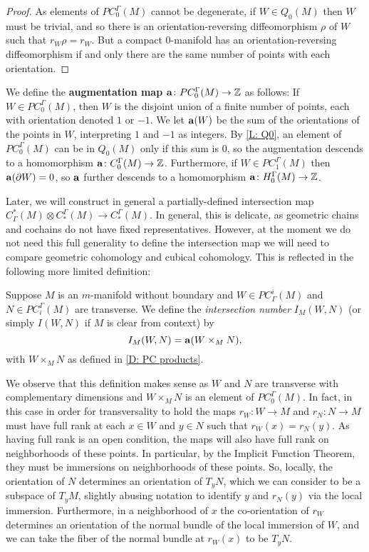 \begin{proof}
	As elements of $PC_0^\Gamma(M)$ cannot be degenerate, if $W \in Q_0(M)$ then $W$ must be trivial, and so there is an orientation-reversing diffeomorphism $\rho$ of $W$ such that $r_W\rho = r_W$.
	But a compact $0$-manifold has an orientation-reversing diffeomorphism if and only there are the same number of points with each orientation.
\end{proof}

\begin{definition}\label{D: aug}
	We define the \textbf{augmentation map} $\mathbf{a} \colon PC^\Gamma_0(M) \to \mathbb{Z}$ as follows: If $W \in PC^\Gamma_0(M)$, then $W$ is the disjoint union of a finite number of points, each with orientation denoted $1$ or $-1$.
	We let $\mathbf{a}(W)$ be the sum of the orientations of the points in $W$, interpreting $1$ and $-1$ as integers.
	By \cref{L: Q0}, an element of $PC^\Gamma_0(M)$ can be in $Q_0(M)$ only if this sum is $0$, so the augmentation descends to a homomorphism $\mathbf{a} \colon C^\Gamma_0(M) \to \mathbb{Z}$.
	Furthermore, if $W \in PC_1^\Gamma(M)$ then $\mathbf{a}(\partial W) = 0$, so $\mathbf{a}$ further descends to a homomorphism $\mathbf{a} \colon H_0^\Gamma(M) \to \mathbb{Z}$.
\end{definition}

Later, we will construct in general a partially-defined intersection map $C^*_\Gamma(M) \otimes C_*^\Gamma(M) \to C_*^\Gamma(M)$.
In general, this is delicate, as geometric chains and cochains do not have fixed representatives.
However, at the moment we do not need this full generality to define the intersection map we will need to compare geometric cohomology and cubical cohomology.
This is reflected in the following more limited definition:

\begin{definition}\label{D: intersection number}
	Suppose $M$ is an $m$-manifold without boundary and $W \in PC_\Gamma^i(M)$ and $N \in PC_{i}^\Gamma(M)$ are transverse.
	We define the \textit{intersection number} $I_M(W,N)$ (or simply $I(W,N)$ if $M$ is clear from context) by $$I_M(W,N) = \mathbf{a}(W \times_M N),$$ with $W \times_M N$ as defined in \cref{D: PC products}.
\end{definition}

We observe that this definition makes sense as $W$ and $N$ are transverse with complementary dimensions and $W \times_M N$ is an element of $PC_0^\Gamma(M)$.
In fact, in this case in order for transversality to hold the maps $r_W \colon W \to M$ and $r_N \colon N \to M$ must have full rank at each $x \in W$ and $y \in N$ such that $r_W(x) = r_N(y)$.
As having full rank is an open condition, the maps will also have full rank on neighborhoods of these points.
In particular, by the Implicit Function Theorem, they must be immersions on neighborhoods of these points.
So, locally, the orientation of $N$ determines an orientation of $T_yN$, which we can consider to be a subspace of $T_{y}M$, slightly abusing notation to identify $y$ and $r_N(y)$ via the local immersion.
Furthermore, in a neighborhood of $x$ the co-orientation of $r_W$ determines an orientation of the normal bundle of the local immersion of $W$, and we can take the fiber of the normal bundle at $r_W(x)$ to be $T_yN$.

